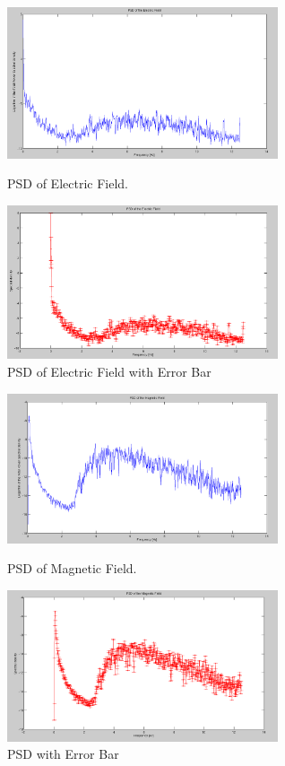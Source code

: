 \documentclass{article}
\begin{document}
\begin{figure}[ht]
\begin{minipage}[c]{0.5\linewidth}
\centering
\includegraphics[width=8cm]{Figures/PSD_electric.png}
\caption{PSD of Electric Field.}
\label{fig:PSD_electric}
\end{minipage}
\hspace{0.1cm}
\begin{minipage}[c]{0.5\linewidth}
\centering
\includegraphics[width=8cm]{Figures/PSD_electric_error.png}
\caption{PSD of Electric Field with Error Bar}
\label{fig:PSD_electric_error}
\end{minipage}
\end{figure}

\begin{figure}[ht]
\begin{minipage}[c]{0.5\linewidth}
\centering
\includegraphics[width=8cm]{Figures/PSD_magnetic.png}
\caption{PSD of Magnetic Field.}
\label{fig:PSD_magnetic}
\end{minipage}
\hspace{0.1cm}
\begin{minipage}[c]{0.5\linewidth}
\centering
\includegraphics[width=8cm]{Figures/PSD_magnetic_error.png}
\caption{PSD with Error Bar}
\label{fig:PSD_magnetic_error}
\end{minipage}
\end{figure}
\end{document}
